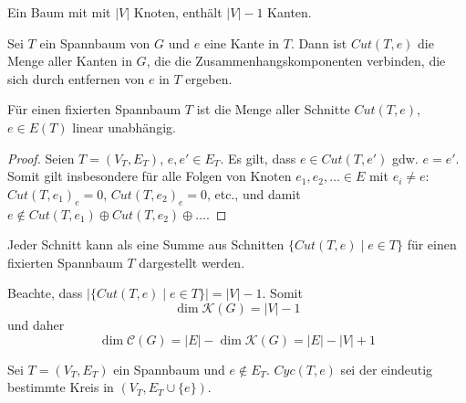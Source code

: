\begin{remark}
    Ein Baum mit mit $ |V| $ Knoten, enthält $ |V| - 1 $ Kanten.
\end{remark}

\begin{definition}
    Sei $ T $ ein Spannbaum von $ G $ und $ e $ eine Kante in $ T $.
    Dann ist $ Cut(T, e) $ die Menge aller Kanten in $ G $, die die Zusammenhangskomponenten verbinden, die sich durch entfernen von $ e $ in $ T $ ergeben.
\end{definition}

\begin{proposition}
    \label{prp:cuts-independent}
    Für einen fixierten Spannbaum $ T $ ist die Menge aller Schnitte $ Cut(T, e) $, $ e \in E(T) $ linear unabhängig.
\end{proposition}

\begin{proof}
    Seien $ T = (V_T, E_T) $, $ e, e' \in E_T $.
    Es gilt, dass $ e \in Cut(T, e') $ gdw. $ e = e' $.
    Somit gilt insbesondere für alle Folgen von Knoten $ e_1, e_2, \dots \in E $ mit $ e_i \ne e $: $ Cut(T, e_1)_e = 0 $, $ Cut(T, e_2)_e = 0 $, etc., und damit $ e \notin Cut(T, e_1) \oplus Cut(T, e_2) \oplus \dots $.
\end{proof}

\begin{proposition}
    Jeder Schnitt kann als eine Summe aus Schnitten $ \{ Cut(T, e) \mid e \in T \} $ für einen fixierten Spannbaum $ T $ dargestellt werden.
\end{proposition}

\begin{proposition}
    \label{prp:dim-bases}
    Beachte, dass $ |\{ Cut(T, e) \mid e \in T \}| = |V| - 1 $.
    Somit
    \begin{equation*}
        \dim \mathcal{K}(G) = |V| - 1
    \end{equation*}
    und daher
    \begin{equation*}
        \dim \mathcal{C}(G) = |E| - \dim \mathcal{K}(G) = |E| - |V| + 1
    \end{equation*}
\end{proposition}

\begin{definition}[Cyc]
    Sei $ T = (V_T, E_T) $ ein Spannbaum und $ e \notin E_T $.
    $ Cyc(T, e) $ sei der eindeutig bestimmte Kreis in $ (V_T, E_T \cup \{ e \}) $.
\end{definition}

